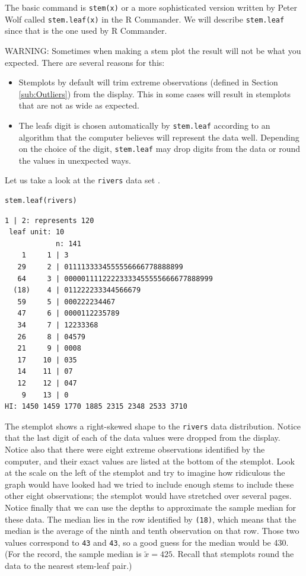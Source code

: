 \documentclass[captions=tableheading]{scrbook}
\begin{document}
The basic command is \texttt{stem(x)} or a more sophisticated version written by Peter Wolf called \texttt{stem.leaf(x)} in the \textsf{R} Commander. We will describe \texttt{stem.leaf} since that is the one used by \textsf{R} Commander.


WARNING: Sometimes when making a stem plot the result will not be what you expected. There are several reasons for this: 
\begin{itemize}
\item Stemplots by default will trim extreme observations (defined in Section \ref{sub:Outliers}) from the display. This in some cases will result in stemplots that are not as wide as expected.
\item The leafs digit is chosen automatically by \texttt{stem.leaf} according to an algorithm that the computer believes will represent the data well. Depending on the choice of the digit, \texttt{stem.leaf} may drop digits from the data or round the values in unexpected ways.
\end{itemize}

Let us take a look at the \texttt{rivers} data set
\label{ite:stemplot-rivers}.


\begin{verbatim}
stem.leaf(rivers)
\end{verbatim}


\begin{verbatim}
1 | 2: represents 120
 leaf unit: 10
            n: 141
    1     1 | 3
   29     2 | 0111133334555556666778888899
   64     3 | 00000111122223333455555666677888999
  (18)    4 | 011222233344566679
   59     5 | 000222234467
   47     6 | 0000112235789
   34     7 | 12233368
   26     8 | 04579
   21     9 | 0008
   17    10 | 035
   14    11 | 07
   12    12 | 047
    9    13 | 0
HI: 1450 1459 1770 1885 2315 2348 2533 3710
\end{verbatim}

The stemplot shows a right-skewed shape to the \texttt{rivers} data distribution. Notice that the last digit of each of the data values were dropped from the display. Notice also that there were eight extreme observations identified by the computer, and their exact values are listed at the bottom of the stemplot. Look at the scale on the left of the stemplot and try to imagine how ridiculous the graph would have looked had we tried to include enough stems to include these other eight observations; the stemplot would have stretched over several pages. Notice finally that we can use the depths to approximate the sample median for these data. The median lies in the row identified by \texttt{(18)}, which means that the median is the average of the ninth and tenth observation on that row. Those two values correspond to \texttt{43} and \texttt{43}, so a good guess for the median would be 430. (For the record, the sample median is \(\widetilde{x}=425\). Recall that stemplots round the data to the nearest stem-leaf pair.) 
\end{document}
